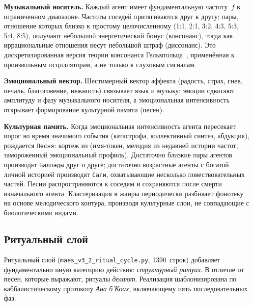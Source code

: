 \documentclass[11pt,a4paper]{article}
\begin{document}
\textbf{Музыкальный носитель.} Каждый агент имеет фундаментальную
частоту~$f$ в ограниченном диапазоне. Частоты соседей притягиваются
друг к другу; пары, отношение которых близко к простому целочисленному
(1:1, 2:1, 3:2, 4:3, 5:3, 5:4, 8:5), получают небольшой энергетический
бонус (консонанс), тогда как иррациональные отношения несут небольшой
штраф (диссонанс). Это дискретизированная версия теории консонанса
Гельмгольца~\cite{helmholtz1863}, применённая к произвольным
осцилляторам, а не только к слуховым сигналам.

\textbf{Эмоциональный вектор.} Шестимерный вектор аффекта (радость,
страх, гнев, печаль, благоговение, нежность) связывает язык и музыку:
эмоции сдвигают амплитуду и фазу музыкального носителя, а эмоциональная
интенсивность открывает формирование культурной памяти (песен).

\textbf{Культурная память.} Когда эмоциональная интенсивность агента
пересекает порог во время значимого события (катастрофа, коллективный
синтез, абдукция), рождается \texttt{Песня}: кортеж из (имя-токен,
мелодия из недавней истории частот, замороженный эмоциональный профиль).
Достаточно близкие пары агентов производят \texttt{Баллады} друг о
друге; достаточно возрастные агенты с богатой личной историей производят
\texttt{Саги}, охватывающие несколько повествовательных частей. Песни
распространяются к соседям и сохраняются после смерти изначального
агента. Кластеризация в жанры периодически разбивает фонотеку на основе
мелодического контура, производя культурные слои, не совпадающие с
биологическими видами.

\subsection{Ритуальный слой}

Ритуальный слой (\texttt{maes\_v3\_2\_ritual\_cycle.py}, 1390~строк)
добавляет фундаментально иную категорию действия: \emph{структурный
ритуал}. В отличие от песен, которые выражают, ритуалы \emph{делают}.
Реализация шаблонизирована по каббалистическому протоколу \emph{Ана
б'Коах}, включающему пять последовательных фаз:
\end{document}
